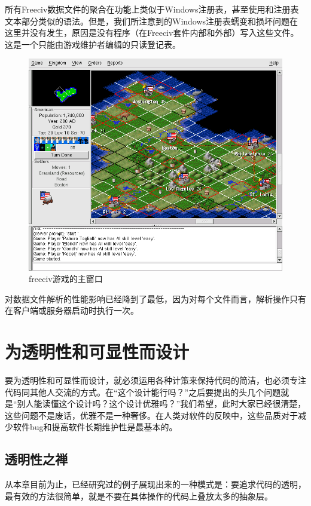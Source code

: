 \documentclass[12pt,oneside]{book}
\begin{document}
所有Freeciv数据文件的聚合在功能上类似于Windows注册表，甚至使用和注册表文本部分类似的语法。但是，我们所注意到的Windows注册表蠕变和损坏问题在这里并没有发生，原因是没有程序（在Freeciv套件内部和外部）写入这些文件。这是一个只能由游戏维护者编辑的只读登记表。

\begin{figure}[H]
\centering
\includegraphics[width=\linewidth ,totalheight=0.95\textheight , keepaspectratio]{freeciv.png}
\caption{freeciv游戏的主窗口}
\end{figure}


对数据文件解析的性能影响已经降到了最低，因为对每个文件而言，解析操作只有在客户端或服务器启动时执行一次。



\section{为透明性和可显性而设计}
要为透明性和可显性而设计，就必须运用各种计策来保持代码的简洁，也必须专注代码同其他人交流的方式。在“这个设计能行吗？”之后要提出的头几个问题就是“别人能读懂这个设计吗？这个设计优雅吗？”我们希望，此时大家已经很清楚，这些问题不是废话，优雅不是一种奢侈。在人类对软件的反映中，这些品质对于减少软件bug和提高软件长期维护性是最基本的。

\subsection{透明性之禅}
从本章目前为止，已经研究过的例子展现出来的一种模式是：要追求代码的透明，最有效的方法很简单，就是不要在具体操作的代码上叠放太多的抽象层。
\end{document}

